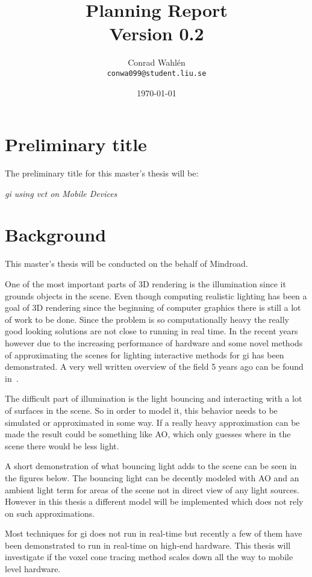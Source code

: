 \documentclass[a4paper, 12pt]{article}
\title{Planning Report \\ \small{Version 0.2}}
\author{Conrad Wahlén \\ \texttt{conwa099@student.liu.se}}
\date{\today}
\begin{document}
\maketitle
\thispagestyle{empty}
\newpage


\section{Preliminary title}
\label{sec:Preliminary title}

The preliminary title for this master's thesis will be:

\textit{\acrlong{gi} using \acrlong{vct} on Mobile Devices}

\section{Background}
\label{sec:Background}

This master's thesis will be conducted on the behalf of Mindroad.

One of the most important parts of 3D rendering is the illumination since it grounds objects in the scene. Even though computing realistic lighting has been a goal of 3D rendering since the beginning of computer graphics there is still a lot of work to be done. Since the problem is so computationally heavy the really good looking solutions are not close to running in real time.
In the recent years however due to the increasing performance of hardware and some novel methods of approximating the scenes for lighting interactive methods for gi has been demonstrated. A very well written overview of the field 5 years ago can be found in~\cite{sotagi}.

The difficult part of illumination is the light bouncing and interacting with a lot of surfaces in the scene. So in order to model it, this behavior needs to be simulated or approximated in some way. If a really heavy approximation can be made the result could be something like AO, which only guesses where in the scene there would be less light.

A short demonstration of what bouncing light adds to the scene can be seen in the figures below. The bouncing light can be decently modeled with AO and an ambient light term for areas of the scene not in direct view of any light sources. However in this thesis a different model will be implemented which does not rely on such approximations.

Most techniques for gi does not run in real-time but recently a few of them have been demonstrated to run in real-time on high-end hardware. This thesis will investigate if the voxel cone tracing method scales down all the way to mobile level hardware.
\end{document}
